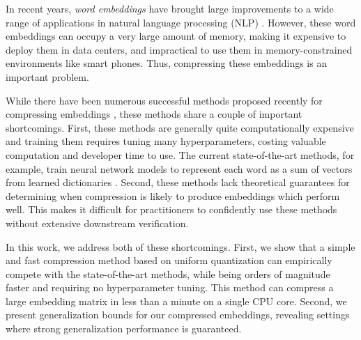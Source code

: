 In recent years, \textit{word embeddings} \citep{word2vec13,glove14,fasttext18} have brought large improvements to a wide range of applications in natural language processing (NLP) \citep{collins16,drqa17}.
However, these word embeddings can occupy a very large amount of memory, making it expensive to deploy them in data centers, and impractical to use them in memory-constrained environments like smart phones. %
Thus, compressing these embeddings is an important problem.

While there have been numerous successful methods proposed recently for compressing embeddings \citep{sparse16,andrews16,dccl17,kway18}, these methods share a couple of important shortcomings.
First, these methods are generally quite computationally expensive and training them requires tuning many hyperparameters, costing valuable computation and developer time to use.
The current state-of-the-art methods, for example, train neural network models to represent each word as a sum of vectors from learned dictionaries \citep{dccl17,kway18}.
Second, these methods lack theoretical guarantees for determining when compression is likely to produce embeddings which perform well.
This makes it difficult for practitioners to confidently use these methods without extensive downstream verification.

In this work, we address both of these shortcomings.
First, we show that a simple and fast compression method based on uniform quantization can empirically compete with the state-of-the-art methods, while being orders of magnitude faster and requiring no hyperparameter tuning.
This method can compress a large embedding matrix in less than a minute on a single CPU core.
Second, we present generalization bounds for our compressed embeddings, revealing settings where strong generalization performance is guaranteed.


